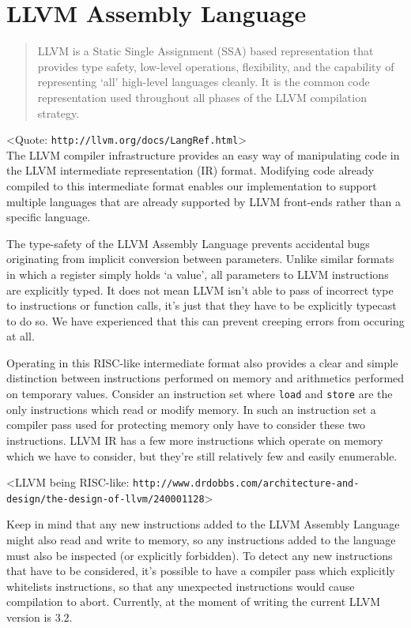 \chapter {LLVM Assembly Language}

\begin{quote}
LLVM is a Static Single Assignment (SSA) based representation that provides
type safety, low-level operations, flexibility, and the capability of
representing `all' high-level languages cleanly. It is the common code
representation used throughout all phases of the LLVM compilation strategy.
\end{quote}

<Quote: \texttt{http://llvm.org/docs/LangRef.html}>\\

\noindent The LLVM compiler infrastructure provides an easy way of manipulating
code in the LLVM intermediate representation (IR) format. Modifying code
already compiled to this intermediate format enables our implementation to
support multiple languages that are already supported by LLVM front-ends rather
than a specific language.

The type-safety of the LLVM Assembly Language prevents accidental bugs
originating from implicit conversion between parameters. Unlike similar formats
in which a register simply holds `a value', all parameters to LLVM instructions
are explicitly typed. It does not mean LLVM isn't able to pass of incorrect type
to instructions or function calls, it's just that they have to be explicitly
typecast to do so. We have experienced that this can prevent creeping errors
from occuring at all.

Operating in this RISC-like intermediate format also provides a clear and
simple distinction between instructions performed on memory and arithmetics
performed on temporary values. Consider an instruction set where \texttt{load}
and \texttt{store} are the only instructions which read or modify memory. In
such an instruction set a compiler pass used for protecting memory only have to
consider these two instructions. LLVM IR has a few more instructions which
operate on memory which we have to consider, but they're still relatively few
and easily enumerable.

<LLVM being RISC-like: \texttt{http://www.drdobbs.com/architecture-and-design/the-design-of-llvm/240001128}>

Keep in mind that any new instructions added to the LLVM Assembly Language might
also read and write to memory, so any instructions added to the language must
also be inspected (or explicitly forbidden). To detect any new instructions that
have to be considered, it's possible to have a compiler pass which explicitly
whitelists instructions, so that any unexpected instructions would cause
compilation to abort. Currently, at the moment of writing the current LLVM
version is $3.2$.


